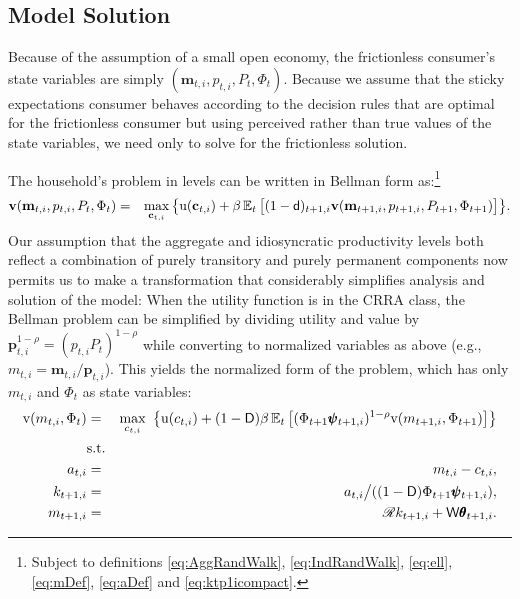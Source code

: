 \documentclass[titlepage]{./econtex}
\begin{document}
\subsection{Model Solution}

Because of the assumption of a small open economy, the frictionless consumer's state variables are simply $(\mathbf{m}_{t,i},p_{t,i},P_t,\Phi_t)$.  Because we assume that the sticky expectations consumer behaves according to the decision rules that are optimal for the frictionless consumer but using perceived rather than true values of the state variables, we need only to solve for the frictionless solution.

The household's problem in levels can be written in Bellman form as:\footnote{Subject to definitions \eqref{eq:AggRandWalk}, \eqref{eq:IndRandWalk}, \eqref{eq:ell}, \eqref{eq:mDef}, \eqref{eq:aDef} and \eqref{eq:ktp1icompact}.}
\begin{eqnarray*}
  \textbf{v}(\mathbf{m}_{t,i},p_{t,i},P_t,\Phi_t)  & = &  \max_{\mathbf{c}_{t,i}}  \big\{ {\mathrm{u}}(\mathbf{c}_{t,i}) + \beta \operatorname{\mathbb{E}}_t \big[(1-\mathsf{d})_{t+1,i}\textbf{v}(\mathbf{m}_{t+1,i},p_{t+1,i},P_{t+1},\Phi_{t+1})\big] \big\}. \nonumber
\end{eqnarray*}
Our assumption that the aggregate and idiosyncratic productivity levels both reflect a combination of purely transitory and purely permanent components now permits us to make a transformation that considerably simplifies analysis and solution of the model: When the utility function is in the CRRA class, the Bellman problem can be simplified by dividing utility and value by $\pmb{p}_{t,i}^{1-\rho} = (p_{t,i}P_t)^{1-\rho}$ while converting to normalized variables as above (e.g., $m_{t,i}=\mathbf{m}_{t,i}/\pmb{p}_{t,i}$). This yields the normalized form of the problem, which has only $m_{t,i}$ and $\Phi_t$ as state variables:
\begin{eqnarray}
    \mathrm{v}({m}_{t,i},\Phi_t) & = & \max_{c_{t,i}} ~ \big\{ {\mathrm{u}}(c_{t,i}) + (1-\mathsf{D}) \beta      \nonumber
                                      \operatorname{\mathbb{E}}_{t}\big[ (\Phi_{t+1} \pmb{\psi}_{t+1,i})^{1-\rho}\mathrm{v}(m_{t+1,i},\Phi_{t+1})\big] \big\}
    \label{eq:scaledv}
\\  & \mbox{s.t.} &
\\    a_{t,i}   & = & m_{t,i} - c_{t,i}, \nonumber
\\    k_{t+1,i} & = & a_{t,i} \big/( (1-\mathsf{D}) \Phi_{t+1} \pmb{\psi}_{t+1,i} ),  \nonumber
\\    m_{t+1,i} & = & \mathscr{R} k_{t+1,i} + \mathsf{W} \pmb{\theta}_{t+1,i}.  \nonumber
\end{eqnarray}
 
\end{document}
